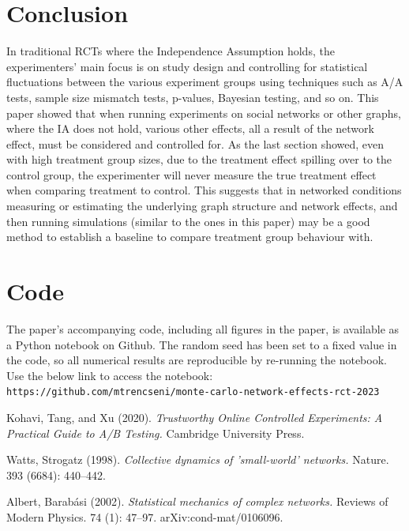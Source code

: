 \documentclass[final,5p,times,twocolumn,authoryear]{elsarticle}
\begin{document}
\section{Conclusion}

In traditional RCTs where the Independence Assumption holds, the experimenters' main focus is on study design and controlling for statistical fluctuations between the various experiment groups using techniques such as A/A tests, sample size mismatch tests, p-values, Bayesian testing, and so on. This paper showed that when running experiments on social networks or other graphs, where the IA does not hold, various other effects, all a result of the network effect, must be considered and controlled for. As the last section showed, even with high treatment group sizes, due to the treatment effect spilling over to the control group, the experimenter will never measure the true treatment effect when comparing treatment to control. This suggests that in networked conditions measuring or estimating the underlying graph structure and network effects, and then running simulations (similar to the ones in this paper) may be a good method to establish a baseline to compare treatment group behaviour with.

\section{Code}

The paper's accompanying code, including all figures in the paper, is available as a Python notebook on Github. The random seed has been set to a fixed value in the code, so all numerical results are reproducible by re-running the notebook. Use the below link to access the notebook:
\texttt{{\scriptsize https://github.com/mtrencseni/monte-carlo-network-effects-rct-2023 }}

 

\begin{thebibliography}{00}

 Kohavi, Tang, and Xu (2020). \textit{Trustworthy Online Controlled Experiments: A Practical Guide to A/B Testing.} Cambridge University Press.

 Watts, Strogatz (1998). \textit{Collective dynamics of 'small-world' networks.} Nature. 393 (6684): 440–442.

 Albert, Barabási (2002). \textit{Statistical mechanics of complex networks.} Reviews of Modern Physics. 74 (1): 47–97. arXiv:cond-mat/0106096.

\end{thebibliography}
\end{document}
